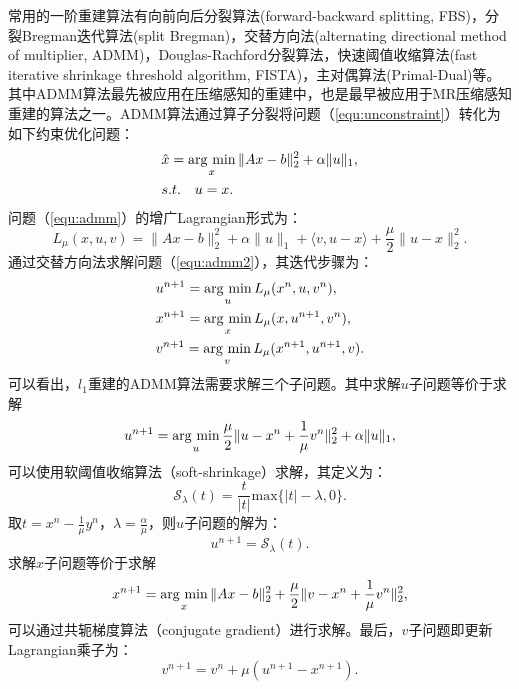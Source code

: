 常用的一阶重建算法有向前向后分裂算法(forward-backward splitting\cite{fbs}, FBS)，分裂Bregman迭代算法(split Bregman\cite{sb})，交替方向法(alternating directional method of multiplier\cite{admm,ramani2010parallel,boyd2011distributed,yang2011alternating}, ADMM)，Douglas-Rachford分裂算法\cite{dr}，快速阈值收缩算法(fast iterative shrinkage threshold algorithm\cite{fista}, FISTA)，主对偶算法(Primal-Dual\cite{pd})等。其中ADMM算法最先被应用在压缩感知的重建中，也是最早被应用于MR压缩感知重建的算法之一。ADMM算法通过算子分裂将问题（\ref{equ:unconstraint}）转化为如下约束优化问题：
\begin{equation}
\begin{aligned}
	&\hat{x}=\argmin_x \|Ax-b\|_2^2 + \alpha\|u\|_1,\\
	& s.t. \quad u=x.
\end{aligned}
\label{equ:admm}
\end{equation}
问题（\ref{equ:admm}）的增广Lagrangian形式为：
\begin{equation}
	L_\mu(x,u,v)=\|Ax-b\|^2_2+\alpha\|u\|_1+\langle v,u-x\rangle +\frac{\mu}{2}\|u-x\|_2^2.
\label{equ:admm2}
\end{equation}
通过交替方向法求解问题（\ref{equ:admm2}），其迭代步骤为：
\begin{equation}
	\begin{aligned}
		& u^{n+1}=\argmin_u L_\mu(x^n,u,v^n),\\
		& x^{n+1}=\argmin_x L_\mu(x,u^{n+1},v^n),\\
		& v^{n+1}=\argmin_v L_\mu(x^{n+1},u^{n+1},v).
	\end{aligned}
	\label{equ:admm3}
\end{equation}
可以看出，$l_1$重建的ADMM算法需要求解三个子问题。其中求解$u$子问题等价于求解
$$u^{n+1}=\argmin_u \frac{\mu}{2}\|u-x^n+\frac{1}{\mu}v^n\|_2^2+\alpha\|u\|_1,$$
可以使用软阈值收缩算法（soft-shrinkage）求解，其定义为：
$$\mathscr{S}_\lambda(t)=\frac{t}{|t|}\mathrm{max}\{|t|-\lambda,0\}.$$
取$t=x^n-\frac{1}{\mu}y^{n}$，$\lambda=\frac{\alpha}{\mu}$，则$u$子问题的解为：
\begin{equation}
	u^{n+1}=\mathscr{S}_\lambda(t).
	\label{equ:admmu}
\end{equation}
求解$x$子问题等价于求解
\begin{equation}
	x^{n+1}=\argmin_x \|Ax-b\|^2_2+\frac{\mu}{2}\|v-x^n+\frac{1}{\mu}v^n\|_2^2,
	\label{equ:admmx}
\end{equation}
可以通过共轭梯度算法\cite{powell1977restart}（conjugate gradient）进行求解。最后，$v$子问题即更新Lagrangian乘子为：
\begin{equation}
	v^{n+1}=v^{n}+\mu(u^{n+1}-x^{n+1}).
\end{equation}
